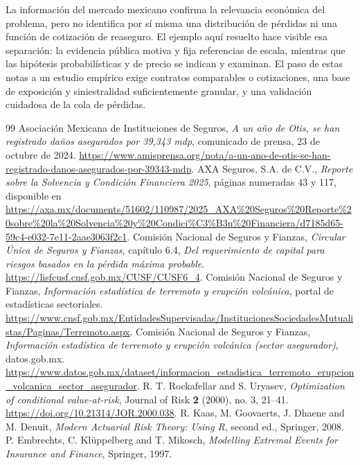 \documentclass[11pt,reqno]{amsart}
\theoremstyle{definition}\newtheorem{definition}[theorem]{Definición}
\theoremstyle{remark}\newtheorem{remark}[theorem]{Observación}
\begin{document}
La información del mercado mexicano confirma la relevancia económica del problema, pero no identifica por sí misma una distribución de pérdidas ni una función de cotización de reaseguro. El ejemplo aquí resuelto hace visible esa separación: la evidencia pública motiva y fija referencias de escala, mientras que las hipótesis probabilísticas y de precio se indican y examinan. El paso de estas notas a un estudio empírico exige contratos comparables o cotizaciones, una base de exposición y siniestralidad suficientemente granular, y una validación cuidadosa de la cola de pérdidas.

\begin{thebibliography}{99}
 Asociación Mexicana de Instituciones de Seguros, \emph{A un año de Otis, se han registrado daños asegurados por 39,343 mdp}, comunicado de prensa, 23 de octubre de 2024. \url{https://www.amisprensa.org/nota/a-un-ano-de-otis-se-han-registrado-danos-asegurados-por-39343-mdp}.
 AXA Seguros, S.A. de C.V., \emph{Reporte sobre la Solvencia y Condición Financiera 2025}, páginas numeradas 43 y 117, disponible en \url{https://axa.mx/documents/51602/110987/2025_AXA%20Seguros%20Reporte%20sobre%20la%20Solvencia%20y%20Condici%C3%B3n%20Financiera/d7185d65-59c4-e032-7e11-2aae3063f2c1}.
 Comisión Nacional de Seguros y Fianzas, \emph{Circular Única de Seguros y Fianzas}, capítulo 6.4, \emph{Del requerimiento de capital para riesgos basados en la pérdida máxima probable}. \url{https://lisfcusf.cnsf.gob.mx/CUSF/CUSF6_4}.
 Comisión Nacional de Seguros y Fianzas, \emph{Información estadística de terremoto y erupción volcánica}, portal de estadísticas sectoriales. \url{https://www.cnsf.gob.mx/EntidadesSupervisadas/InstitucionesSociedadesMutualistas/Paginas/Terremoto.aspx}.
 Comisión Nacional de Seguros y Fianzas, \emph{Información estadística de terremoto y erupción volcánica (sector asegurador)}, datos.gob.mx. \url{https://www.datos.gob.mx/dataset/informacion_estadistica_terremoto_erupcion_volcanica_sector_asegurador}.
 R. T. Rockafellar and S. Uryasev, \emph{Optimization of conditional value-at-risk}, Journal of Risk \textbf{2} (2000), no. 3, 21--41. \url{https://doi.org/10.21314/JOR.2000.038}.
 R. Kaas, M. Goovaerts, J. Dhaene and M. Denuit, \emph{Modern Actuarial Risk Theory: Using R}, second ed., Springer, 2008.
 P. Embrechts, C. Kl\"uppelberg and T. Mikosch, \emph{Modelling Extremal Events for Insurance and Finance}, Springer, 1997.
\end{thebibliography}
\end{document}
